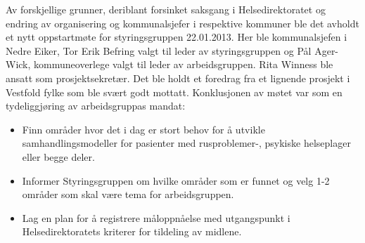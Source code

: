 \documentclass[11pt]{report} %
\begin{document}
                Av forskjellige grunner, deriblant forsinket saksgang i Helsedirektoratet og endring av organisering og kommunalsjefer i respektive kommuner ble det avholdt et nytt oppstartmøte for styringsgruppen 22.01.2013. Her ble kommunalsjefen i Nedre Eiker, Tor Erik Befring valgt til leder av styringsgruppen og Pål Ager-Wick, kommuneoverlege valgt til leder av arbeidsgruppen. Rita Winness ble ansatt som prosjektsekretær. Det ble holdt et foredrag fra et lignende prosjekt i Vestfold fylke \cite{sporVf}som ble svært godt mottatt. 
                Konklusjonen av møtet var \cite{strgr_mref13-1}som en tydeliggjøring av arbeidsgruppas mandat:
                  \begin{itemize}
                  \item Finn områder hvor det i dag er stort behov for å utvikle samhandlingsmodeller for pasienter med rusproblemer-, psykiske helseplager eller begge deler.\\
                  \item Informer Styringsgruppen om hvilke områder som er funnet og velg 1-2 områder som skal være tema for arbeidsgruppen.\\
                  \item Lag en plan for å registrere måloppnåelse med utgangspunkt i Helsedirektoratets kriterer for tildeling av midlene.\\
                  \end{itemize}
\end{document}
